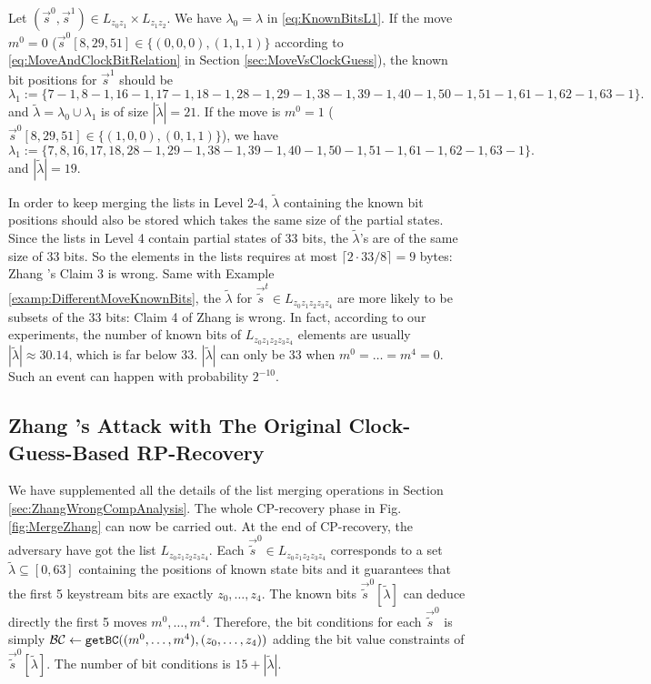 \begin{example}\label{examp:DifferentMoveKnownBits}
  Let $(\vec{s}^0,\vec{s}^1)\in L_{z_0z_1}\times L_{z_1z_2}$.
  We have $\lambda_0=\lambda$ in \eqref{eq:KnownBitsL1}. 
  If the move $m^0=0$ ($\vec{s}^0[8,29,51]\in\{(0,0,0),(1,1,1)\}$ according to \eqref{eq:MoveAndClockBitRelation} in Section \ref{sec:MoveVsClockGuess}), the known bit positions for $\vec{s}^1$ should be
  \[
  \lambda_1:=\{7-1,8-1,16-1,17-1,18-1,   28-1,29-1,38-1,39-1,40-1,  50-1,51-1,61-1,62-1,63-1  \}.
  \]
  and $\tilde{\lambda}=\lambda_0 \cup \lambda_1$ is of size $|\tilde{\lambda}|=21$. 
  If the move is $m^0=1$ ($\vec{s}^0[8,29,51]\in  \{(1,0,0),(0,1,1)\}$), we have
  \[
  \lambda_1:=\{7,8,16,17,18,   28-1,29-1,38-1,39-1,40-1,  50-1,51-1,61-1,62-1,63-1  \}.
  \]
  and $|\tilde{\lambda}|=19$.
\end{example}
In order to keep merging the lists in Level 2-4, $\tilde{\lambda}$ containing the known bit positions should also be stored which takes the same size of the partial states.
Since the lists in Level 4 contain partial states of 33 bits, the $\tilde{\lambda}$'s are of the same size of 33 bits.
So the elements in the lists requires at most $\lceil 2\cdot 33/8\rceil=9$ bytes: Zhang \etal's Claim 3 is wrong.
Same with Example \ref{examp:DifferentMoveKnownBits}, the $\tilde{\lambda}$ for $\vec{\tilde{s}}^t\in L_{z_0z_1z_2z_3z_4}$ are more likely to be subsets of the 33 bits: Claim 4 of Zhang \etal is wrong.
In fact, according to our experiments, the number of known bits of $L_{z_0z_1z_2z_3z_4}$ elements are usually $|\tilde{\lambda}|\approx 30.14$, which is far below 33. 
$|\tilde{\lambda}|$ can only be 33 when $m^0=\ldots= m^4=0$. 
Such an event can happen with probability $2^{-10}$. 


\subsection{Zhang \etal's Attack with The Original Clock-Guess-Based RP-Recovery}\label{sec:ZhangRpRecovery}
We have supplemented all the details of the list merging operations in Section \ref{sec:ZhangWrongCompAnalysis}. 
The whole CP-recovery phase in Fig. \ref{fig:MergeZhang} can now be carried out. 
At the end of CP-recovery, the adversary have got the list $L_{z_0z_1z_2z_3z_4}$. 
Each $\vec{\tilde{s}}^0\in L_{z_0z_1z_2z_3z_4}$ corresponds to a set $\tilde{\lambda}\subseteq [0,63]$ containing the positions of known state bits and it guarantees that the first 5 keystream bits are exactly $z_0,\ldots, z_4$. 
The known bits $\vec{\tilde{s}}^0[\tilde{\lambda}]$ can deduce directly the first 5 moves $m^0,\ldots, m^4$. 
Therefore, the bit conditions for each $\vec{\tilde{s}}^0$ is simply $\mathcal{BC}\leftarrow {\tt getBC}((m^0,\ldots, m^4), (z_0,\ldots, z_4))$ adding the bit value constraints of $\vec{\tilde{s}}^0[\tilde{\lambda}]$. 
The number of bit conditions is $15+|\tilde{\lambda}|$. 

